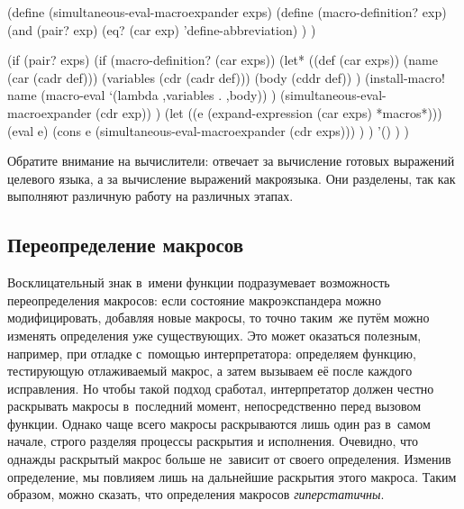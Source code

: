 \begin{code:lisp}
(define (simultaneous-eval-macroexpander exps)
  (define (macro-definition? exp)
    (and (pair? exp)
         (eq? (car exp) 'define-abbreviation) ) )

  (if (pair? exps)
      (if (macro-definition? (car exps))
          (let* ((def       (car exps))
                 (name      (car (cadr def)))
                 (variables (cdr (cadr def)))
                 (body      (cddr def)) )
            (install-macro!
             name (macro-eval `(lambda ,variables . ,body)) )
            (simultaneous-eval-macroexpander (cdr exp)) )
          (let ((e (expand-expression (car exps) *macros*)))
            (eval e)
            (cons e (simultaneous-eval-macroexpander (cdr exps))) ) )
      '() ) )
\end{code:lisp}

Обратите внимание на вычислители:  отвечает за вычисление готовых
выражений целевого языка, а  за вычисление выражений макроязыка.
Они разделены, так как выполняют различную работу на различных этапах.


\subsection{Переопределение макросов}\label{macros/define/ssect:redefinition}

Восклицательный знак в~имени функции  подразумевает
возможность переопределения макросов: если состояние макроэкспандера можно
модифицировать, добавляя новые макросы, то точно таким~же путём можно изменять
определения уже существующих. Это может оказаться полезным, например, при
отладке с~помощью интерпретатора: определяем функцию, тестирующую отлаживаемый
макрос, а затем вызываем её после каждого исправления. Но чтобы такой подход
сработал, интерпретатор должен честно раскрывать макросы в~последний момент,
непосредственно перед вызовом функции. Однако чаще всего макросы раскрываются
лишь один раз в~самом начале, строго разделяя процессы раскрытия и исполнения.
Очевидно, что однажды раскрытый макрос больше не~зависит от своего определения.
Изменив определение, мы повлияем лишь на дальнейшие раскрытия этого макроса.
Таким образом, можно сказать, что определения макросов \emph{гиперстатичны}.


